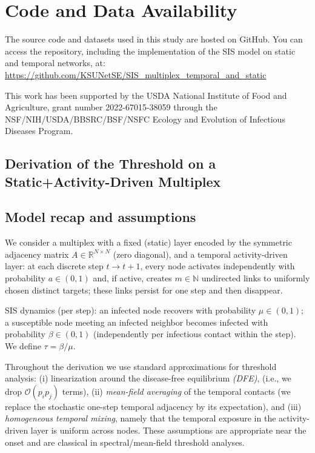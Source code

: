 \documentclass[pdflatex,sn-mathphys-num]{sn-jnl}%
\theoremstyle{thmstyleone}%
\theoremstyle{thmstyletwo}%
\theoremstyle{thmstylethree}%
\begin{document}
\section*{Code and Data Availability}
The source code and datasets used in this study are hosted on GitHub. You can access the repository, including the implementation of the SIS model on static and temporal networks, at: \url{https://github.com/KSUNetSE/SIS_multiplex_temporal_and_static}

This work has been supported by the USDA National Institute of Food and Agriculture, grant number 2022-67015-38059 through the NSF/NIH/USDA/BBSRC/BSF/NSFC Ecology and Evolution of Infectious Diseases Program.

\begin{appendices}

\section{Derivation of the Threshold on a Static+Activity-Driven Multiplex}
\label{sec:appendix}

\subsection{Model recap and assumptions}
We consider a multiplex with a fixed (static) layer encoded by the symmetric adjacency
matrix $A\in\mathbb{R}^{N\times N}$ (zero diagonal), and a temporal activity-driven layer:
at each discrete step $t\to t+1$, every node activates independently with probability
$a\in(0,1)$ and, if active, creates $m\in\mathbb{N}$ undirected links to uniformly chosen
distinct targets; these links persist for one step and then disappear.

SIS dynamics (per step): an infected node recovers with probability $\mu\in(0,1)$; a
susceptible node meeting an infected neighbor becomes infected with probability
$\beta\in(0,1)$ (independently per infectious contact within the step). We define
$\tau=\beta/\mu$.

Throughout the derivation we use standard approximations for threshold analysis:
(i) linearization around the disease-free equilibrium \emph{(DFE)},
(i.e., we drop $\mathcal{O}(p_i p_j)$ terms), (ii) \emph{mean-field averaging} of the
temporal contacts (we replace the stochastic one-step temporal adjacency by its
expectation), and (iii) \emph{homogeneous temporal mixing}, namely that the temporal
exposure in the activity-driven layer is uniform across nodes. These assumptions are
appropriate near the onset and are classical in spectral/mean-field threshold analyses.


\end{appendices}
\end{document}

